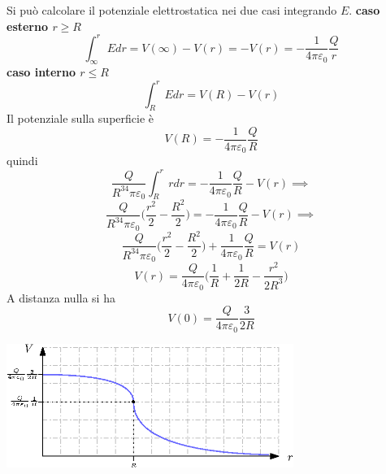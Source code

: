 \documentclass[10pt, letterpaper]{report}
\begin{document}
Si può calcolare il potenziale elettrostatica nei due casi integrando $E$.\acc  
\textbf{caso esterno $r\ge R$} 
$$ \int_{\infty}^r E dr = V(\infty)-V(r)=-V(r)=-\frac{1}{4\pi\varepsilon_0}\frac{Q}{r}$$
\textbf{caso interno $r\le R$}
$$ \int_{R}^r E dr = V(R)-V(r)$$
Il potenziale sulla superficie è 
$$ V(R)=-\frac{1}{4\pi\varepsilon_0}\frac{Q}{R}$$
quindi 
$$ \frac{Q}{R^34\pi\varepsilon_0}\int_{R}^r r dr = -\frac{1}{4\pi\varepsilon_0}\frac{Q}{R}-V(r) \implies $$
$$ \frac{Q}{R^34\pi\varepsilon_0}\Big( \frac{r^2}{2}-\frac{R^2}{2}\Big) = -\frac{1}{4\pi\varepsilon_0}\frac{Q}{R}-V(r) \implies $$
$$ \frac{Q}{R^34\pi\varepsilon_0}\Big( \frac{r^2}{2}-\frac{R^2}{2}\Big)  +\frac{1}{4\pi\varepsilon_0}\frac{Q}{R}=V(r) $$
$$ V(r)=\frac{Q}{4\pi\varepsilon_0}\Big( \frac{1}{R}+\frac{1}{2R}-\frac{r^2}{2R^3} \Big)$$
A distanza nulla si ha 
$$ V(0)=\frac{Q}{4\pi\varepsilon_0}\frac{3}{2R} $$
\begin{center}
    \includegraphics[width=0.7\textwidth]{images/potenzialeSfera.eps}
\end{center}\flowerLine 
\end{document}
